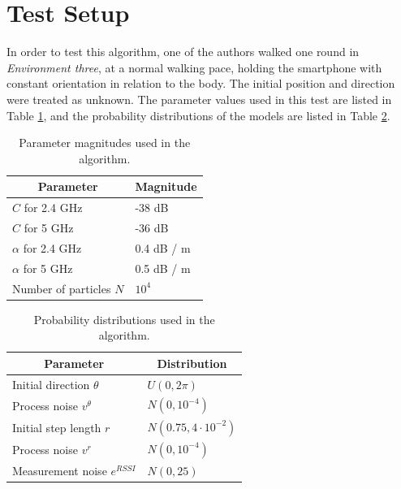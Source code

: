 \documentclass{LTHthesis}
\begin{document}
\section{Test Setup}

In order to test this algorithm, one of the authors walked one round in \emph{Environment three}, at a normal walking pace, holding the smartphone with constant orientation in relation to the body. The initial position and direction were treated as unknown. The parameter values used in this test are listed in Table \ref{table:parameters_careful_user_test}, and the probability distributions of the models are listed in Table \ref{table:parameter_distributions}.

\begin{table}[!hbt]
\begin{center}
\begin{tabular}{|l|l|}
\hline
\multicolumn{1}{|c|}{Parameter} & \multicolumn{1}{c|}{Magnitude} \\
\hline
\hline
$C$ for 2.4 GHz & -38 dB \\
\hline
$C$ for 5 GHz &         -36 dB\\
\hline
$\alpha$ for 2.4 GHz & 0.4 dB / m \\
\hline
$\alpha$ for 5 GHz & 0.5 dB / m \\
\hline 
Number of particles $N$ & $10^4$ \\
\hline 


\end{tabular}
\end{center}
\caption{Parameter magnitudes used in the algorithm.}\label{table:parameters_careful_user_test}
\end{table}


\begin{table}[!hbt]
\begin{center}
\begin{tabular}{|l|l|}
\hline
\multicolumn{1}{|c|}{Parameter} & \multicolumn{1}{c|}{Distribution} \\
\hline
\hline
Initial direction $\theta$ & $U(0,2\pi)$ \\
\hline
Process noise $v ^\theta$ & $N(0,10^{-4})$ \\
\hline
Initial step length $r$ & $N(0.75, 4 \cdot 10^{-2})$ \\
\hline
Process noise $v^r$ & $N(0,10^{-4})$ \\
\hline
Measurement noise $e^{RSSI}$ & $N(0,25)$ \\
\hline


\end{tabular}
\end{center}
\caption{Probability distributions used in the algorithm.}\label{table:parameter_distributions}
\end{table}
\end{document}
